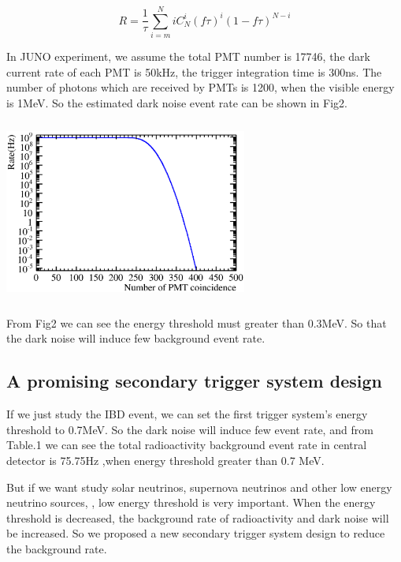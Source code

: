 \documentclass[a4paper,10pt,twoside]{paper}
\begin{document}
\begin{multicols}{2}
		\begin{displaymath}
			R = \frac{1}{\tau}\sum_{i=m}^{N}iC^{i}_{N}(f\tau)^i
			(1-f\tau)^{N-i}
		\end{displaymath}


		In JUNO experiment, we assume the total PMT number is 17746, 
		the dark current rate of each PMT is 50kHz, the trigger 
		integration time is 300ns. The number of photons which are
		received by PMTs is 1200, when the visible energy is 1MeV.
		So the estimated dark noise event rate can be shown in Fig2.

		\begin{center}
			\includegraphics[width=8cm,height=6cm]{Noise_rate_50kHz_300ns.eps}
		\end{center}


		From Fig2 we can see the energy threshold must greater than 0.3MeV. So that
		the dark noise will induce few background event rate. 


		\subsection{A promising secondary trigger system design}

		If we just study the IBD event, we can set the first trigger system's energy
		threshold to 0.7MeV. So the dark noise will induce few event rate, and from 
		Table.1 we can see the total radioactivity background event rate in central
		detector is 75.75Hz ,when energy threshold greater than 0.7 MeV.

		But if we want study solar neutrinos, supernova neutrinos and other low energy neutrino sources,
		, low energy threshold is very important. When the energy threshold is decreased,
		the background rate of radioactivity and dark noise will be increased. 
		So we proposed a new secondary trigger system design to reduce the background rate.


\end{multicols}
\end{document}
